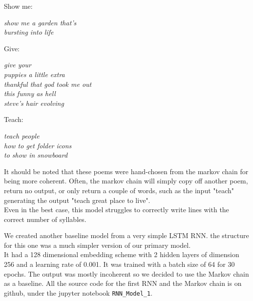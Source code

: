 \documentclass{article} %
\begin{document}
Show me:
\begin{flushleft}
  \textit{
      \hspace{2em} show me a garden that's \\
      \hspace{2em} bursting into life
  }
\end{flushleft}

Give:
\begin{flushleft}
  \textit{
      \hspace{2em} give your \\
      \hspace{2em} puppies a little extra\\
      \hspace{2em} thankful that god took me out\\
      \hspace{2em} this funny as hell\\
      \hspace{2em} steve's hair evolving\\
  }
\end{flushleft}


 Teach:
 \begin{flushleft}
  \textit{
      \hspace{2em} teach people  \\
      \hspace{2em} how to get folder icons\\
      \hspace{2em} to show in snowboard\\
  }
\end{flushleft}

It should be noted that these poems were hand-chosen from the markov chain for being more coherent. Often, the markov chain will simply copy
off another poem, return no output, or only return a couple of words, such as the input "teach" generating the output "teach great place to live".\\

Even in the best case, this model struggles to correctly write lines with the correct number of syllables.

We created another baseline model from a very simple LSTM RNN. the structure for this one was a much simpler version of our primary model.\\

It had a 128 dimensional embedding scheme with 2 hidden layers of dimension 256 and a learning rate of 0.001. It was trained with a batch size of 64
for 30 epochs. The output was mostly incoherent so we decided to use the Markov chain as a baseline. All the source code for the first RNN and the
Markov chain is on github, under the jupyter notebook \texttt{RNN\_Model\_1}.
\end{document}
